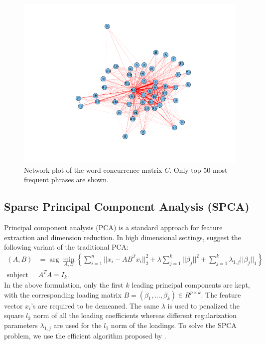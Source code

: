 \documentclass[11pt]{article}
\newcommand{\1}[1]{{\mathbf 1}\left\{#1\right\}}        %
\begin{document}
\begin{center}
\begin{figure}[tb]
   \centering
   \includegraphics[width=\textwidth]{../coocurResults/cooccurNetwork.png} 
      \caption{Network plot of the word concurrence matrix $C$. Only top 50 most frequent phrases are shown.}
   \label{fig:coocur}
\end{figure}
\end{center}



\subsection{Sparse Principal Component Analysis (SPCA)}
Principal component analysis (PCA) is a standard approach for feature extraction and dimension reduction. In high dimensional settings, \cite{zou2006sparse} suggest the following variant of the traditional PCA:
\begin{align}
(A,B) & = \arg \min_{A,B} \left \{ \sum_{i=1}^n||x_i-AB^Tx_i||_2^2 + \lambda \sum_{j=1}^k||\beta_j||^2 + \sum_{j=1}^k\lambda_{1,j}||\beta_j||_1 \right\} \\ 
\text{subject to } & A^TA = I_{k}. \nonumber
\end{align}
In the above formulation, only the first $k$ leading principal components are kept, with the corresponding loading matrix $B = (\beta_1,...,\beta_k) \in R^{p\times k}$. The feature vector $x_i$'s are required to be demeaned. The same $\lambda$ is used to penalized the square $l_2$ norm of all the loading coefficients whereas different regularization parameters $\lambda_{1,j}$ are used for the $l_1$ norm of the loadings. To solve the SPCA problem, we use the efficient algorithm proposed by \cite{zou2006sparse}. 
\end{document}
